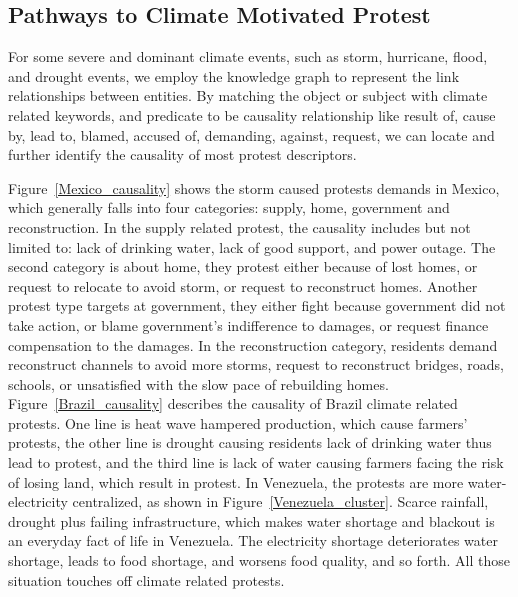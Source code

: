 \documentclass[9pt,twocolumn,twoside]{pnas-new}
\begin{document}
\subsection*{Pathways to Climate Motivated Protest}
For some severe and dominant climate events, such as storm, hurricane, flood, and drought events, we employ the knowledge graph to represent the link relationships between entities. By matching the object or subject with climate related keywords, and predicate to be causality relationship like result of, cause by, lead to, blamed, accused of, demanding, against, request, we can locate and further identify the causality of most protest descriptors.

Figure~\ref{Mexico_causality} shows the storm caused protests demands in Mexico, which generally falls into four categories: supply, home, government and reconstruction. In the supply related protest, the causality includes but not limited to: lack of drinking water, lack of good support, and power outage. The second category is about home, they protest either because of lost homes, or request to relocate to avoid storm, or request to reconstruct homes. Another protest type targets at government, they either fight because government did not take action, or blame government's indifference to damages, or request finance compensation to the damages. In the reconstruction category, residents demand reconstruct channels to avoid more storms, request to reconstruct bridges, roads, schools, or unsatisfied with the slow pace of rebuilding homes. Figure~\ref{Brazil_causality} describes the causality of Brazil climate related protests. One line is heat wave hampered production, which cause farmers' protests, the other line is drought causing residents lack of drinking water thus lead to protest, and the third line is lack of water causing farmers facing the risk of losing land, which result in protest. In Venezuela, the protests are more water-electricity centralized, as shown in Figure~\ref{Venezuela_cluster}. Scarce rainfall, drought plus failing infrastructure, which makes water shortage and blackout is an everyday fact of life in Venezuela. The electricity shortage deteriorates water shortage, leads to food shortage, and worsens food quality, and so forth. All those situation touches off climate related protests.
\end{document}
